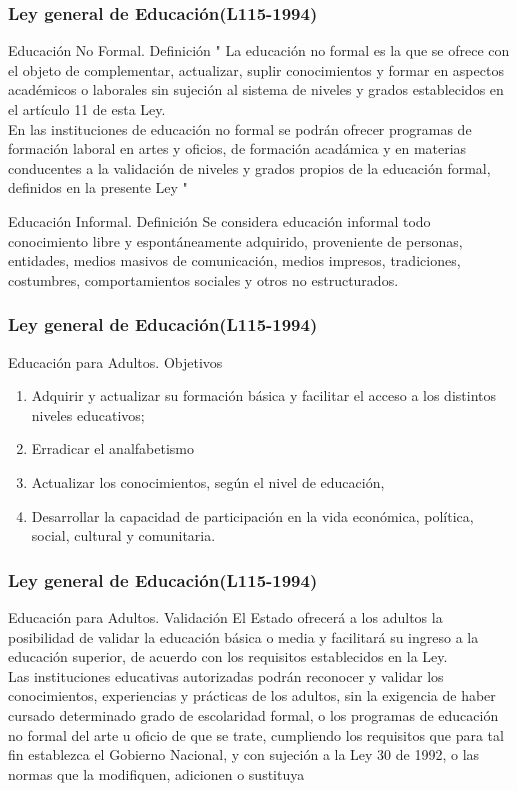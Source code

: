 \documentclass{beamer}
\begin{document}
\begin{frame}
\frametitle{Ley general de Educaci\'on(L115-1994)}
\begin{block}{Educaci\'on No Formal. Definici\'on}
" La educaci\'on no formal es la que se ofrece con el objeto de complementar, actualizar, suplir conocimientos y formar en aspectos acad\'emicos o laborales sin sujeci\'on al sistema de niveles y grados establecidos en el art\'iculo 11 de esta Ley. \newline
[...]\\
En  las instituciones de educaci\'on no formal se podr\'an ofrecer
programas de formaci\'on laboral en artes y oficios, de formaci\'on acad\'amica y en materias conducentes a la validaci\'on de niveles y grados propios de la educaci\'on formal, definidos en la presente Ley "
\end{block}
\end{frame}
\begin{frame}
\begin{block}{Educaci\'on Informal. Definici\'on}
Se considera educaci\'on informal todo conocimiento libre y espont\'aneamente adquirido, proveniente de personas, entidades, medios masivos de comunicaci\'on, medios
impresos, tradiciones, costumbres, comportamientos sociales y otros no estructurados.
\end{block}
\end{frame}
\begin{frame}
\frametitle{Ley general de Educaci\'on(L115-1994)}
\begin{block}{Educaci\'on para Adultos. Objetivos}
 \begin{enumerate}
\item Adquirir y actualizar su formaci\'on b\'asica y facilitar el acceso a los distintos niveles educativos; 
\item  Erradicar el analfabetismo
\item  Actualizar los conocimientos, seg\'un el nivel de educaci\'on,
\item Desarrollar la capacidad de participaci\'on en la vida econ\'omica, pol\'itica, social, cultural y comunitaria.
\end{enumerate}
\end{block}
\end{frame}
\begin{frame}
\frametitle{Ley general de Educaci\'on(L115-1994)}
\begin{block}{Educaci\'on para Adultos. Validaci\'on }
El Estado ofrecer\'a a los adultos la posibilidad de validar la educaci\'on b\'asica o media y facilitar\'a su ingreso a la educaci\'on superior, de acuerdo con los requisitos establecidos en la Ley.\\
Las instituciones educativas autorizadas podr\'an reconocer y validar los conocimientos, experiencias y pr\'acticas de los adultos, sin la exigencia de haber cursado determinado grado de escolaridad formal, o los programas de educación no formal del arte u oficio de que se trate, cumpliendo los requisitos que para tal fin establezca el Gobierno Nacional, y con sujeci\'on a la Ley 30 de 1992, o las normas que la modifiquen, adicionen o sustituya
\end{block}
\end{frame}
\end{document}
